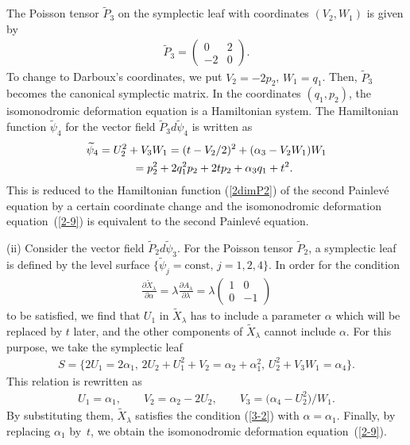 \documentclass[10pt,a4paper]{amsart}
\numberwithin{equation}{section}
\begin{document}
The Poisson tensor $\widetilde{P}_3$ on the symplectic leaf with coordinates $(V_2,W_1)$ is given by
\begin{gather*}
\widetilde{P}_3 = \left(
\begin{matrix}
0 & 2 \\
-2 & 0
\end{matrix}
\right).
\end{gather*}
To change to Darboux's coordinates, we put $V_2 = -2p_2$, $W_1 = q_1$. Then, $\widetilde{P}_3$ becomes the canonical symplectic matrix. In the coordinates $(q_1, p_2)$, the isomonodromic deformation equation is a Hamiltonian system. The Hamiltonian function $\widetilde{\psi}_4$ for the vector f\/ield $\widetilde{P}_3d\widetilde{\psi}_4$ is written as
\begin{gather*}
\widetilde{\psi}_4 = U_2^2 + V_3W_1 = (t - V_2/2)^2 + (\alpha _3 - V_2W_1)W_1 \\
\hphantom{\widetilde{\psi}_4}{} = p_2^2 + 2q_1^2p_2 + 2tp_2 + \alpha _3 q_1 + t^2.
\end{gather*}
This is reduced to the Hamiltonian function (\ref{2dimP2}) of the second Painlev\'{e} equation by a certain coordinate change and the isomonodromic deformation equation~(\ref{2-9}) is equivalent to the second Painlev\'{e} equation.

(ii) Consider the vector f\/ield $\widetilde{P}_2 d\widetilde{\psi}_3$. For the Poisson tensor $\widetilde{P}_2$, a symplectic leaf is def\/ined by the level surface $\{ \widetilde{\psi}_j = \text{const},\, j=1,2,4\}$.
In order for the condition
\begin{gather}
\frac{\partial \widetilde{X}_\lambda }{\partial \alpha } = \lambda \frac{\partial A_\lambda }{\partial \lambda } = \lambda \left(
\begin{matrix}
1 & 0 \\
0 & -1
\end{matrix}
\right)\label{3-2}
\end{gather}
to be satisf\/ied, we f\/ind that $U_1$ in $\widetilde{X}_\lambda $ has to include a parameter $\alpha $ which will be replaced by $t$ later, and the other components of $\widetilde{X}_\lambda $ cannot include $\alpha $. For this purpose, we take the symplectic leaf
\begin{gather*}
S = \big\{ 2U_1 = 2 \alpha _1,\, 2U_2+U_1^2+V_2 = \alpha _2+\alpha _1^2 ,\, U_2^2+V_3W_1 = \alpha _4\big \}.
\end{gather*}
This relation is rewritten as
\begin{gather*}
U_1 = \alpha _1,\qquad V_2 = \alpha _2 - 2U_2, \qquad V_3 = \big(\alpha _4-U_2^2\big)/W_1.
\end{gather*}
By substituting them, $\widetilde{X}_\lambda $ satisf\/ies the condition (\ref{3-2}) with $\alpha =\alpha _1$. Finally, by replacing $\alpha _1$ by~$t$, we obtain the isomonodromic deformation equation~(\ref{2-9}).
\end{document}
